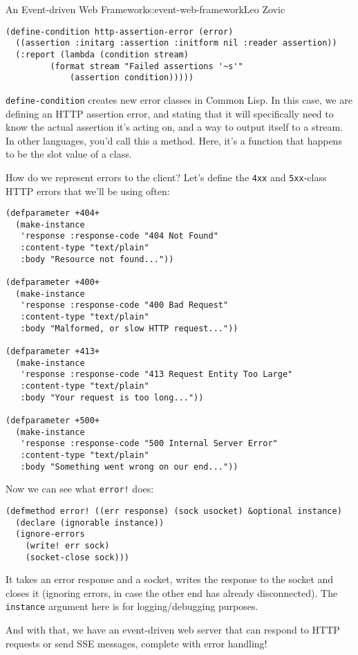 \begin{aosachapter}{An Event-driven Web Framework}{s:event-web-framework}{Leo Zovic}
\begin{verbatim}
(define-condition http-assertion-error (error)
  ((assertion :initarg :assertion :initform nil :reader assertion))
  (:report (lambda (condition stream)
         (format stream "Failed assertions '~s'"
             (assertion condition)))))
\end{verbatim}

\texttt{define-condition} creates new error classes in Common Lisp. In
this case, we are defining an HTTP assertion error, and stating that it
will specifically need to know the actual assertion it's acting on, and
a way to output itself to a stream. In other languages, you'd call this
a method. Here, it's a function that happens to be the slot value of a
class.

How do we represent errors to the client? Let's define the \texttt{4xx}
and \texttt{5xx}-class HTTP errors that we'll be using often:

\begin{verbatim}
(defparameter +404+
  (make-instance
   'response :response-code "404 Not Found"
   :content-type "text/plain"
   :body "Resource not found..."))

(defparameter +400+
  (make-instance
   'response :response-code "400 Bad Request"
   :content-type "text/plain"
   :body "Malformed, or slow HTTP request..."))

(defparameter +413+
  (make-instance
   'response :response-code "413 Request Entity Too Large"
   :content-type "text/plain"
   :body "Your request is too long..."))

(defparameter +500+
  (make-instance
   'response :response-code "500 Internal Server Error"
   :content-type "text/plain"
   :body "Something went wrong on our end..."))
\end{verbatim}

Now we can see what \texttt{error!} does:

\begin{verbatim}
(defmethod error! ((err response) (sock usocket) &optional instance)
  (declare (ignorable instance))
  (ignore-errors
    (write! err sock)
    (socket-close sock)))
\end{verbatim}

It takes an error response and a socket, writes the response to the
socket and closes it (ignoring errors, in case the other end has already
disconnected). The \texttt{instance} argument here is for
logging/debugging purposes.

And with that, we have an event-driven web server that can respond to
HTTP requests or send SSE messages, complete with error handling!


\end{aosachapter}
